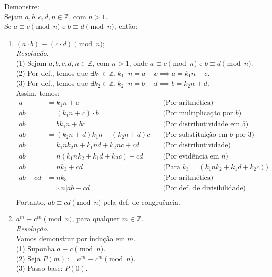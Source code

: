 Demonstre: \\
Sejam $a, b, c, d, n \in \mathbb{Z}$, com $n > 1$. \\
Se $a\equiv c \pmod{n}$ e $b\equiv d \pmod{n}$, então:
\begin{enumerate}
	\item $(a \cdot b)\equiv (c \cdot d) \pmod{n}$; \\
	\emph{Resolução}. \\
	(1) Sejam $a, b, c, d, n \in \mathbb{Z}$, com $n > 1$, onde $a\equiv c \pmod{n}$ e $b\equiv d \pmod{n}$. \\
	(2) Por def., temos que $\exists k_1 \in \mathbb{Z}, k_1 \cdot n = a - c \implies a = k_1n + c$. \\
	(3) Por def., temos que $\exists k_2 \in \mathbb{Z}, k_2 \cdot n = b - d \implies b = k_2n + d$. \\
	Assim, temos:
	\begin{align*}
		a &= k_1n + c &\quad \text{(Por aritmética)} \\
		ab &= (k_1n + c) \cdot b &\quad \text{(Por multiplicação por $b$)} \\
		ab &= bk_1n + bc &\quad \text{(Por distributividade em 5)} \\
		ab &= (k_2n + d)k_1n + (k_2n + d)c &\quad \text{(Por substituição em $b$ por 3)} \\
		ab &= k_1nk_2n + k_1nd + k_2nc + cd &\quad \text{(Por distributividade)} \\
		ab &= n (k_1nk_2 + k_1d + k_2c) + cd &\quad \text{(Por evidência em $n$)} \\
		ab &= nk_3 + cd &\quad \text{(Para $k_3 = (k_1nk_2 + k_1d + k_2c)$)} \\
		ab - cd &= nk_3 &\quad \text{(Por aritmética)} \\
		&\implies n | ab - cd &\quad \text{(Por def. de divisibilidade)} \\
	\end{align*}
	Portanto, $ab \equiv cd \pmod{n}$ pela def. de congruência.
	\item $a^m \equiv c^m \pmod{n}$, para qualquer $m \in \mathbb{Z}$. \\
	\emph{Resolução}. \\
	Vamos demonstrar por indução em $m$. \\
		(1) Suponha $a \equiv c \pmod{n}$. \\
		(2) Seja $P(m) := a^m \equiv c^m \pmod{n}$. \\
		(3) Passo base: $P(0)$.
			\begin{align*}

\end{align*}
\end{enumerate}
